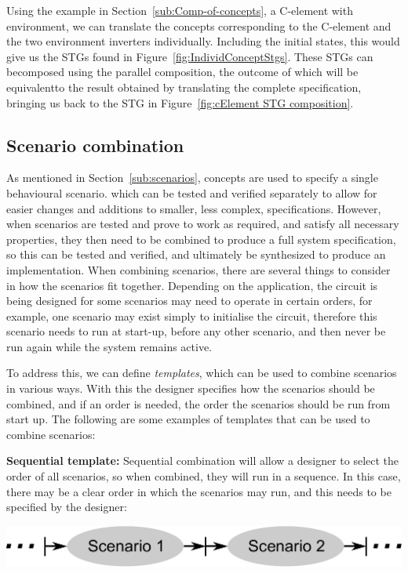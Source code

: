 \documentclass[british, journal]{IEEEtran}
\begin{document}
Using the example in Section~\ref{sub:Comp-of-concepts}, a C-element with
environment,
we can translate the concepts corresponding to the C-element and the two
environment inverters individually. Including the initial states, this would
give us the STGs found in Figure~\ref{fig:IndividConceptStgs}. These STGs can becomposed using the parallel composition, the outcome of which will be equivalentto the result obtained by translating the complete specification, bringing us
back
to the STG in Figure~\ref{fig:cElement STG composition}.

\vspace{-1mm}
\subsection{Scenario combination\label{sub:scenario-composition}}

As mentioned in Section~\ref{sub:scenarios}, concepts are used to specify
a single behavioural scenario.
which can be tested and verified separately to allow for easier changes and additions 
to smaller, less complex, specifications. However, when scenarios are tested and
 prove to work as required, and satisfy all necessary properties, they then need 
to be combined to produce a full system specification, so this can be tested and 
verified, and ultimately be synthesized to produce an implementation. 
When combining scenarios, there are several things to consider in how the scenarios fit together.
Depending on the application, the circuit is being designed for
some scenarios may need to operate in certain
orders, for example, one scenario may exist simply to initialise the
circuit, therefore this scenario needs to run at start-up, before
any other scenario, and then never be run again while the
system remains active.

To address this, we can define \emph{templates},
which can be used to combine scenarios in various ways.
With this the designer specifies how the scenarios should
be combined, and if an order is needed, the order the scenarios should
be run from start up. The following are some examples of templates
that can be used to combine scenarios:

\textbf{Sequential template:} Sequential combination will allow a designer
to select the order of all scenarios, so when combined, they will
run in a sequence. In this case, there may be a clear order in which
the scenarios may run, and this needs to be specified by the designer:

\vspace{-2mm}
\begin{center}
\includegraphics[scale=0.42]{Images/sequential_combination}
\end{center}
\end{document}
